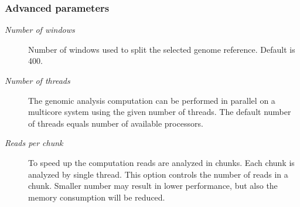 \documentclass[a4paper,10pt,english]{sphinxmanual}
\begin{document}
\subsubsection{Advanced parameters}
\label{analysis:advanced-parameters}\begin{description}
\item[{\emph{Number of windows}}] \leavevmode
Number of windows used to split the selected genome reference. Default is 400.

\item[{\emph{Number of threads}}] \leavevmode
The genomic analysis computation can be performed in parallel on a multicore system using the given number of threads. The default number of threads equals number of available processors.

\item[{\emph{Reads per chunk}}] \leavevmode
To speed up the computation reads are analyzed in chunks. Each chunk is analyzed by single thread. This option controls the number of reads in a chunk. Smaller number may result in lower performance, but also the memory consumption will be reduced.

\end{description}
\end{document}
